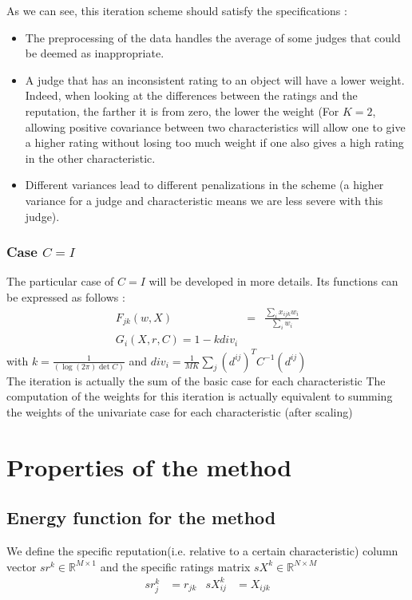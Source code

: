 \documentclass[12pt,a4paper]{article}
\begin{document}
As we can see, this iteration scheme should satisfy the specifications : 
\begin{itemize}
\item The preprocessing of the data handles the average of some judges that could be deemed as inappropriate.
\item A judge that has an inconsistent rating to an object will have a lower weight. Indeed, when looking at the differences between the ratings and the reputation, the farther it is from zero, the lower the weight (For $K=2$, allowing positive covariance between two characteristics will allow one to give a higher rating without losing too much weight if one also gives a high rating in the other characteristic.
\item Different variances lead to different penalizations in the scheme (a higher variance for a judge and characteristic means we are less severe with this judge).
\end{itemize}
\subsubsection*{Case $C = I$}
The particular case of $C=I$ will be developed in more details. Its functions can be expressed as follows :
\begin{eqnarray}
F_{jk}(w,X) & = & \frac{\sum_{i}x_{ijk}w_{i}}{\sum_i w_{i}}\label{eq:rep}\\
G_{i}(X,r,C) = 1 -k div_i \label{eq:w8}
\end{eqnarray}
with $k= \frac{1}{(\log(2\pi ) \det C)}$ and $div_i =  \frac{1}{MK}\sum_{j} (d^{ij})^T C^{-1} (d^{ij})$\\

The iteration is actually the sum of the basic case for each characteristic
The computation of the weights for this iteration is actually equivalent to summing the weights of the univariate case for each characteristic (after scaling)


\section{Properties of the method}
\subsection{Energy function for the method}
We define the specific reputation(i.e. relative to a certain characteristic) column vector $ sr^k \in \mathbb{R}^{M\times 1}$ and the specific ratings matrix $sX^k \in \mathbb{R}^{N\times M}$
\begin{align*}
sr^k_{j} &= r_{jk} & sX^k_{ij} &= X_{ijk}
\end{align*}
\end{document}
